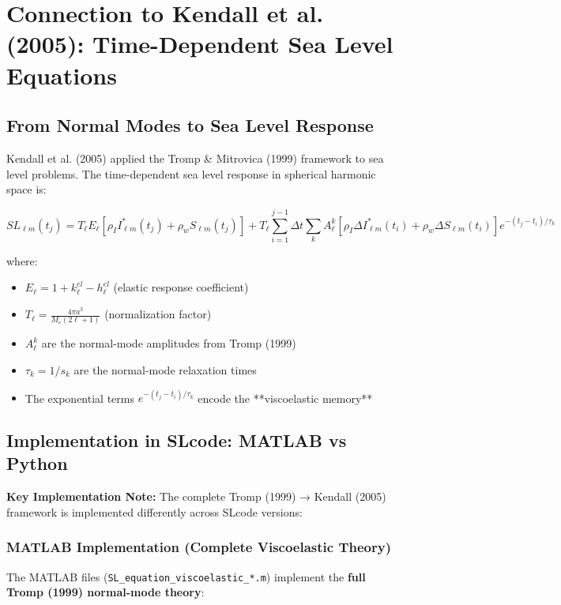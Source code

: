 \documentclass{article}
\begin{document}
\section{Connection to Kendall et al. (2005): Time-Dependent Sea Level Equations}

\subsection{From Normal Modes to Sea Level Response}

Kendall et al. (2005) applied the Tromp \& Mitrovica (1999) framework to sea level problems. The time-dependent sea level response in spherical harmonic space is:

\begin{equation}
SL_{\ell m}(t_j) = T_\ell E_\ell[\rho_I I^*_{\ell m}(t_j) + \rho_w S_{\ell m}(t_j)] + T_\ell \sum_{i=1}^{j-1} \Delta t \sum_k A_\ell^k[\rho_I \Delta I^*_{\ell m}(t_i) + \rho_w \Delta S_{\ell m}(t_i)] e^{-(t_j-t_i)/\tau_k}
\end{equation}

where:
\begin{itemize}
\item $E_\ell = 1 + k_\ell^{el} - h_\ell^{el}$ (elastic response coefficient)
\item $T_\ell = \frac{4\pi a^3}{M_e(2\ell + 1)}$ (normalization factor)
\item $A_\ell^k$ are the normal-mode amplitudes from Tromp (1999)
\item $\tau_k = 1/s_k$ are the normal-mode relaxation times
\item The exponential terms $e^{-(t_j-t_i)/\tau_k}$ encode the **viscoelastic memory**
\end{itemize}

\subsection{Implementation in SLcode: MATLAB vs Python}

\textbf{Key Implementation Note:} The complete Tromp (1999) → Kendall (2005) framework is implemented differently across SLcode versions:

\subsubsection{MATLAB Implementation (Complete Viscoelastic Theory)}

The MATLAB files ({\tt SL\_equation\_viscoelastic\_*.m}) implement the \textbf{full Tromp (1999) normal-mode theory}:
\end{document}
